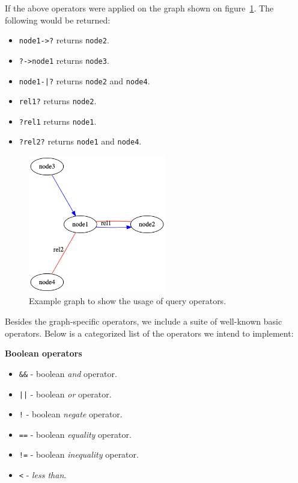 If the above operators were applied on the graph shown on figure~\ref{fig:syntax_query_operators_example_out}.
The following would be returned:

\begin{itemize}
    \item \lstinline{node1->?} returns \lstinline{node2}.
    \item \lstinline{?->node1} returns \lstinline{node3}.
    \item \lstinline{node1-|?} returns \lstinline{node2} and \lstinline{node4}.
    \item \lstinline{rel1?} returns \lstinline{node2}.
    \item \lstinline{?rel1} returns \lstinline{node1}.
    \item \lstinline{?rel2?} returns \lstinline{node1} and \lstinline{node4}.
\end{itemize}

\begin{figure}[H]
    \centering
    \includegraphics[width=6cm]{figures/syntax_section/syntax_query_operators}
    \caption{Example graph to show the usage of query operators.}
    \label{fig:syntax_query_operators_example_out}
\end{figure}

Besides the graph-specific operators, we include a suite of well-known basic operators.
Below is a categorized list of the operators we intend to implement:


\textbf{Boolean operators}
\begin{itemize}
    \item \lstinline{&&} - boolean \emph{and} operator.
    \item \lstinline{||} - boolean \emph{or} operator.
    \item \lstinline{!} - boolean \emph{negate} operator.
    \item \lstinline{==} - boolean \emph{equality} operator.
    \item \lstinline{!=} - boolean \emph{inequality} operator.
    \item \lstinline{<} - \emph{less than}.
\end{itemize}


